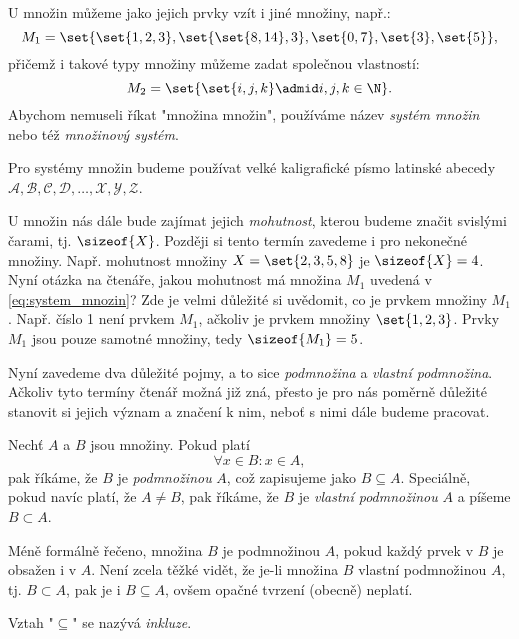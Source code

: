 U množin můžeme jako jejich prvky vzít i jiné množiny, např.:
\begin{equation}\label{eq:system_mnozin}
    M_1=\set{\set{1,2,3},\set{\set{8,14},3},\set{0,7}, \set{3}, \set{5}},
\end{equation}
přičemž i takové typy množiny můžeme zadat společnou vlastností:
\begin{equation*}
    M_2=\set{\set{i,j,k} \admid i,j,k\in\N}.
\end{equation*}
Abychom nemuseli říkat "množina množin", používáme název \emph{systém množin} nebo též \emph{množinový systém}.
\begin{convention}
    Pro systémy množin budeme používat velké kaligrafické písmo latinské abecedy $\mathcal{A},\mathcal{B},\mathcal{C},\mathcal{D},\dots,\mathcal{X},\mathcal{Y},\mathcal{Z}$.
\end{convention}
U množin nás dále bude zajímat jejich \emph{mohutnost}, kterou budeme značit svislými čarami, tj. $\sizeof{X}$. Později si tento termín zavedeme i pro nekonečné množiny. Např. mohutnost množiny $X=\set{2,3,5,8}$ je $\sizeof{X}=4$. Nyní otázka na čtenáře, jakou mohutnost má množina $M_1$ uvedená v \eqref{eq:system_mnozin}? Zde je velmi důležité si uvědomit, co je prvkem množiny $M_1$. Např. číslo 1 není prvkem $M_1$, ačkoliv je prvkem množiny $\set{1,2,3}$. Prvky $M_1$ jsou pouze samotné množiny, tedy $\sizeof{M_1}=5$.\par
\medskip
Nyní zavedeme dva důležité pojmy, a to sice \emph{podmnožina} a \emph{vlastní podmnožina}. Ačkoliv tyto termíny čtenář možná již zná, přesto je pro nás poměrně důležité stanovit si jejich význam a značení k nim, neboť s nimi dále budeme pracovat.
\begin{definition}\label{def:podmnozina}
    Nechť $A$ a $B$ jsou množiny. Pokud platí
    \begin{equation*}
        \forall x\in B: x\in A,
    \end{equation*}
    pak říkáme, že $B$ je \emph{podmnožinou} $A$, což zapisujeme jako $B \subseteq A$. Speciálně, pokud navíc platí, že $A \neq B$, pak říkáme, že $B$ je \emph{vlastní podmnožinou} $A$ a píšeme $B \subset A$.
\end{definition}
Méně formálně řečeno, množina $B$ je podmnožinou $A$, pokud každý prvek v $B$ je obsažen i v $A$. Není zcela těžké vidět, že je-li množina $B$ vlastní podmnožinou $A$, tj. $B \subset A$, pak je i $B \subseteq A$, ovšem opačné tvrzení (obecně) neplatí.
\begin{remark}
    Vztah "$\subseteq$" se nazývá \emph{inkluze}.
\end{remark}
